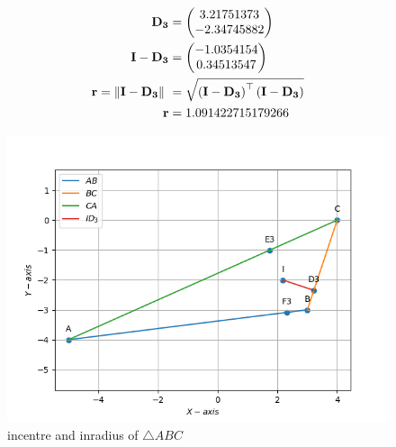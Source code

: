 \documentclass[10pt]{book}
\begin{document}
\begin{enumerate}[label=\thesection.\arabic*.,ref=\thesection.\theenumi]
\begin{enumerate}
\begin{align}
       \vec{D_3} &= \myvec{3.21751373 \\ -2.34745882}  \\
       \vec{I - D_3} &= \myvec{-1.0354154 \\0.34513547} \\
 \vec{r}= \norm{\vec{I}-\vec{D_3}}\ &=  \sqrt{\brak{\vec{I}-\vec{D_3}}^{\top}\brak{\vec{I}-\vec{D_3}}} \\
 \vec{r} &= 1.091422715179266
   \end{align}
\end{enumerate}
\begin{figure}[H]
    \centering
    \includegraphics{figs/Incentre_I.png}
    \caption{incentre and inradius of $\triangle ABC$}
    \label{fig:Ang_bisect2}
\end{figure}


\end{enumerate}
\end{document}
